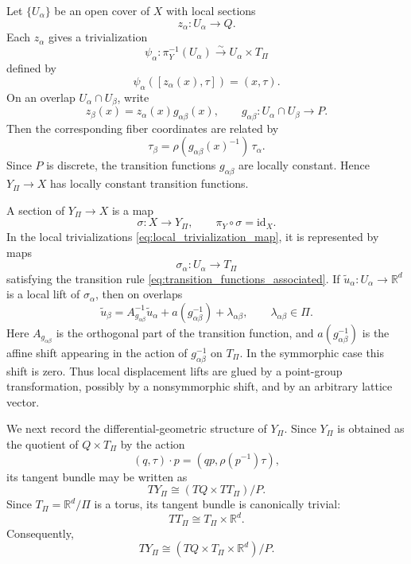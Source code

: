\documentclass[11pt]{amsart}
\theoremstyle{plain}
\theoremstyle{definition}
\theoremstyle{remark}
\begin{document}
Let \(\{U_\alpha\}\) be an open cover of \(X\) with local sections
\[
z_\alpha:U_\alpha\to Q.
\]
Each \(z_\alpha\) gives a trivialization
\begin{equation}
	\psi_\alpha:\pi_Y^{-1}(U_\alpha)\xrightarrow{\sim} U_\alpha\times T_\Pi
	\label{eq:local_trivialization_map}
\end{equation}
defined by
\begin{equation}
	\psi_\alpha([z_\alpha(x),\tau])=(x,\tau).
	\label{eq:local_trivialization_formula}
\end{equation}
On an overlap \(U_\alpha\cap U_\beta\), write
\[
z_\beta(x)=z_\alpha(x)g_{\alpha\beta}(x),
\qquad
g_{\alpha\beta}:U_\alpha\cap U_\beta\to P.
\]
Then the corresponding fiber coordinates are related by
\begin{equation}
	\tau_\beta
	=
	\rho(g_{\alpha\beta}(x)^{-1})\,\tau_\alpha .
	\label{eq:transition_functions_associated}
\end{equation}
Since \(P\) is discrete, the transition functions \(g_{\alpha\beta}\) are locally constant. Hence \(Y_\Pi\to X\) has locally constant transition functions.

A section of \(Y_\Pi\to X\) is a map
\begin{equation}
	\sigma:X\to Y_\Pi,
	\qquad
	\pi_Y\circ \sigma=\mathrm{id}_X.
	\label{eq:section_Ypi}
\end{equation}
In the local trivializations \eqref{eq:local_trivialization_map}, it is represented by maps
\[
\sigma_\alpha:U_\alpha\to T_\Pi
\]
satisfying the transition rule \eqref{eq:transition_functions_associated}. 
If \(\widetilde u_\alpha:U_\alpha\to \mathbb R^d\) is a local lift of \(\sigma_\alpha\), then on overlaps
\begin{equation}
	\widetilde u_\beta
	=
	A_{g_{\alpha\beta}}^{-1}\widetilde u_\alpha
	+
	a(g_{\alpha\beta}^{-1})
	+
	\lambda_{\alpha\beta},
	\qquad
	\lambda_{\alpha\beta}\in \Pi.
	\label{eq:local_lift_relation}
\end{equation}
Here \(A_{g_{\alpha\beta}}\) is the orthogonal part of the transition function, and \(a(g_{\alpha\beta}^{-1})\) is the affine shift appearing in the action of \(g_{\alpha\beta}^{-1}\) on \(T_\Pi\). 
In the symmorphic case this shift is zero. 
Thus local displacement lifts are glued by a point-group transformation, possibly by a nonsymmorphic shift, and by an arbitrary lattice vector.

\medskip

We next record the differential-geometric structure of \(Y_\Pi\). 
Since \(Y_\Pi\) is obtained as the quotient of \(Q\times T_\Pi\) by the action
\[
(q,\tau)\cdot p=(qp,\rho(p^{-1})\tau),
\]
its tangent bundle may be written as
\[
TY_\Pi\cong (TQ\times TT_\Pi)/P.
\]
Since \(T_\Pi=\mathbb R^d/\Pi\) is a torus, its tangent bundle is canonically trivial:
\[
TT_\Pi\cong T_\Pi\times \mathbb R^d.
\]
Consequently,
\begin{equation}
	TY_\Pi \cong (TQ\times T_\Pi\times \mathbb R^d)/P.
	\label{eq:TYpi_final}
\end{equation}
\end{document}
